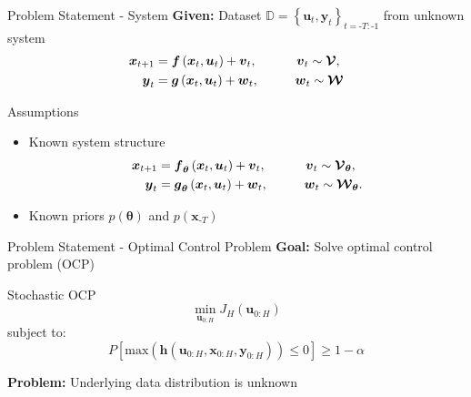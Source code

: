 \documentclass[student, noshadow, itr, english, aspectratio=169]{ITR_LSR_slides}
\begin{document}
\begin{frame}{Problem Statement - System}	
	\textbf{Given:} Dataset $\mathbb{D} = \left\{\boldsymbol{u}_{t}, \boldsymbol{y}_{t}\right\}_{t = \text{-}T:\text{-}1}$ from unknown system
	\begin{equation*}
	\begin{split}
	\boldsymbol{x}_{t+1} &= \boldsymbol{f} \left( \boldsymbol{x}_{t}, \boldsymbol{u}_t \right) + \boldsymbol{v}_{t}, \makebox[1cm]{\hfill} \; \boldsymbol{v}_{t} \sim \boldsymbol{\mathcal{V}},\\
	\boldsymbol{y}_{t} &= \boldsymbol{g} \left( \boldsymbol{x}_{t}, \boldsymbol{u}_t \right) + \boldsymbol{w}_{t}, \makebox[1cm]{\hfill} \boldsymbol{w}_{t} \sim \boldsymbol{\mathcal{W}}
	\end{split}
	\end{equation*}

	\begin{block}{Assumptions}
	\begin{itemize}
		\item 
		Known system structure
	\begin{equation*}
	\begin{split}
	\boldsymbol{x}_{t+1} &= \boldsymbol{f}_{\boldsymbol{\theta}} \left( \boldsymbol{x}_{t}, \boldsymbol{u}_t \right) + \boldsymbol{v}_{t}, \makebox[1cm]{\hfill} \; \boldsymbol{v}_{t} \sim \boldsymbol{\mathcal{V}}_{\boldsymbol{\theta}},\\
	\boldsymbol{y}_{t} &= \boldsymbol{g}_{\boldsymbol{\theta}} \left( \boldsymbol{x}_{t}, \boldsymbol{u}_t \right) + \boldsymbol{w}_{t}, \makebox[1cm]{\hfill} \boldsymbol{w}_{t} \sim \boldsymbol{\mathcal{W}}_{\boldsymbol{\theta}}.
	\end{split}
	\end{equation*}
	\item 
	Known priors $p(\boldsymbol{\theta})$ and $p(\boldsymbol{x}_{\text{-}T})$
	\end{itemize}
	\end{block}	


\end{frame}

\begin{frame}{Problem Statement - Optimal Control Problem}	
	\textbf{Goal:} Solve optimal control problem (OCP)\\
	\begin{block}{Stochastic OCP}
		\begin{equation*}
		\min\limits_{\boldsymbol{u}_{0:H}} J_H(\boldsymbol{u}_{0:H}) 
		\end{equation*}
		subject to: 
		\begin{equation*}
		P \left[  \text{max}(\boldsymbol{h}(\boldsymbol{u}_{0:H},  \boldsymbol{x}_{0:H},  \boldsymbol{y}_{0:H})) \leq 0 \right] \geq 1 - \alpha
		\end{equation*}
	\end{block}	
	\textbf{Problem:} Underlying data distribution is unknown
\end{frame}
\end{document}
